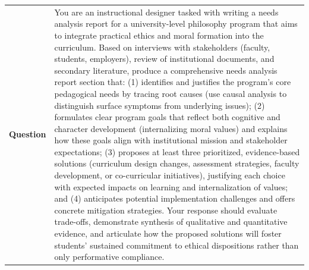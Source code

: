 \begin{longtable}{@{}l p{12.5cm}@{}}
  \textbf{Question} & You are an instructional designer tasked with writing a needs analysis report for a university-level philosophy program that aims to integrate practical ethics and moral formation into the curriculum. Based on interviews with stakeholders (faculty, students, employers), review of institutional documents, and secondary literature, produce a comprehensive needs analysis report section that: (1) identifies and justifies the program's core pedagogical needs by tracing root causes (use causal analysis to distinguish surface symptoms from underlying issues); (2) formulates clear program goals that reflect both cognitive and character development (internalizing moral values) and explains how these goals align with institutional mission and stakeholder expectations; (3) proposes at least three prioritized, evidence-based solutions (curriculum design changes, assessment strategies, faculty development, or co-curricular initiatives), justifying each choice with expected impacts on learning and internalization of values; and (4) anticipates potential implementation challenges and offers concrete mitigation strategies. Your response should evaluate trade-offs, demonstrate synthesis of qualitative and quantitative evidence, and articulate how the proposed solutions will foster students' sustained commitment to ethical dispositions rather than only performative compliance. \\

\end{longtable}
